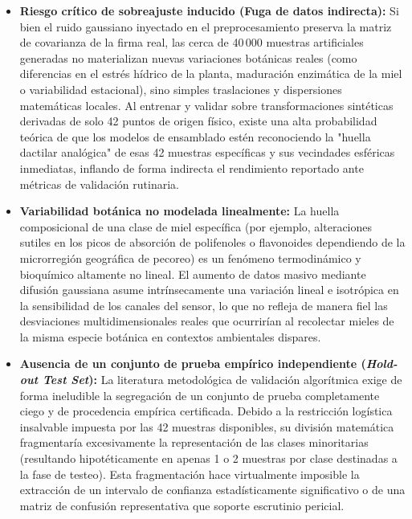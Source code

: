 \begin{itemize}
    \item \textbf{Riesgo crítico de sobreajuste inducido (Fuga de datos indirecta):} Si bien el ruido gaussiano inyectado en el preprocesamiento preserva la matriz de covarianza de la firma real, las cerca de 40\,000 muestras artificiales generadas no materializan nuevas variaciones botánicas reales (como diferencias en el estrés hídrico de la planta, maduración enzimática de la miel o variabilidad estacional), sino simples traslaciones y dispersiones matemáticas locales. Al entrenar y validar sobre transformaciones sintéticas derivadas de solo 42 puntos de origen físico, existe una alta probabilidad teórica de que los modelos de ensamblado estén reconociendo la "huella dactilar analógica" de esas 42 muestras específicas y sus vecindades esféricas inmediatas, inflando de forma indirecta el rendimiento reportado ante métricas de validación rutinaria.
    
    \item \textbf{Variabilidad botánica no modelada linealmente:} La huella composicional de una clase de miel específica (por ejemplo, alteraciones sutiles en los picos de absorción de polifenoles o flavonoides dependiendo de la microrregión geográfica de pecoreo) es un fenómeno termodinámico y bioquímico altamente no lineal. El aumento de datos masivo mediante difusión gaussiana asume intrínsecamente una variación lineal e isotrópica en la sensibilidad de los canales del sensor, lo que no refleja de manera fiel las desviaciones multidimensionales reales que ocurrirían al recolectar mieles de la misma especie botánica en contextos ambientales dispares.

    \item \textbf{Ausencia de un conjunto de prueba empírico independiente (\textit{Hold-out Test Set}):} La literatura metodológica de validación algorítmica exige de forma ineludible la segregación de un conjunto de prueba completamente ciego y de procedencia empírica certificada. Debido a la restricción logística insalvable impuesta por las 42 muestras disponibles, su división matemática fragmentaría excesivamente la representación de las clases minoritarias (resultando hipotéticamente en apenas 1 o 2 muestras por clase destinadas a la fase de testeo). Esta fragmentación hace virtualmente imposible la extracción de un intervalo de confianza estadísticamente significativo o de una matriz de confusión representativa que soporte escrutinio pericial.
\end{itemize}

